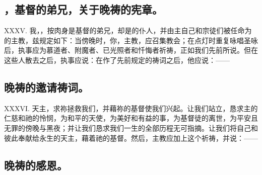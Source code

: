 
\subsection{，基督的弟兄，关于晚祷的宪章。}

XXXV. 我，，按肉身是基督的弟兄，却是的仆人，并由主自己和宗徒们被任命为的主教，兹规定如下：当傍晚时，你，主教，应召集教会；在点灯时重复咏唱圣咏后，执事应为慕道者、附魔者、已光照者和忏悔者祈祷，正如我们先前所说。但在这些人散去之后，执事应说：在作了先前规定的祷词之后，他应说：——\par


\subsection{晚祷的邀请祷词。}

XXXVI. 天主，求祢拯救我们，并藉祢的基督使我们兴起。让我们站立，恳求主的仁慈和祂的怜悯，为和平的天使，为美好和有益的事，为基督徒的离世，为平安且无罪的傍晚与黑夜；并让我们恳求我们一生的全部历程无可指摘。让我们将自己和彼此奉献给永生的天主，藉着祂的基督。然后，主教应加上这个祈祷，并说：——\par


\subsection{晚祷的感恩。}

